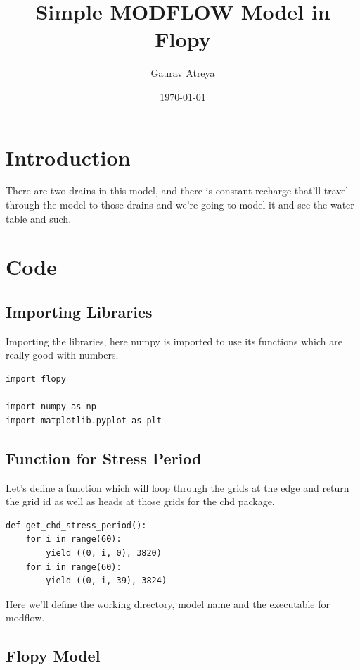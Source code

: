 \documentclass[titlepage,12pt]{unisubmission}
\author{Gaurav Atreya}
\date{\today}
\title{Simple MODFLOW Model in Flopy}
\begin{document}
\maketitle
\setcounter{tocdepth}{2}
\tableofcontents

\section{Introduction}
\label{sec:org7ee6559}
There are two drains in this model, and there is constant recharge that'll travel through the model to those drains and we're going to model it and see the water table and such.


\section{Code}
\label{sec:orgd9abf57}

\subsection{Importing Libraries}
\label{sec:org5c29155}
Importing the libraries, here numpy is imported to use its functions which are really good with numbers.

\begin{verbatim}
import flopy

import numpy as np
import matplotlib.pyplot as plt
\end{verbatim}

\subsection{Function for Stress Period}
\label{sec:orgdbbf1a4}
Let's define a function which will loop through the grids at the edge and return the grid id as well as heads at those grids for the chd package.

\begin{verbatim}
def get_chd_stress_period():
    for i in range(60):
        yield ((0, i, 0), 3820)
    for i in range(60):
        yield ((0, i, 39), 3824)
\end{verbatim}

Here we'll define the working directory, model name and the executable for modflow.

\subsection{Flopy Model}
\label{sec:org9230cdc}
\end{document}
